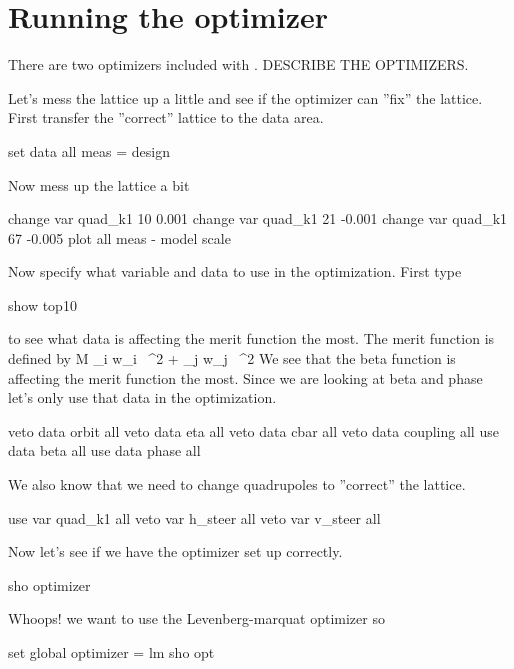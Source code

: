 \documentclass{book}
\begin{document}
\chapter{Running the optimizer}
\label{c:optimizer}

There are two optimizers included with \tao. DESCRIBE THE OPTIMIZERS.

Let's mess the lattice up a little and see if the optimizer can ''fix'' the
lattice. First transfer the ''correct'' lattice to the  data area.
\begin{example}
  set data all meas = design
\end{example}
Now mess up the lattice a bit
\begin{example}
  change var quad\_k1 10 0.001
  change var quad\_k1 21 -0.001
  change var quad\_k1 67 -0.005
  plot all meas - model
  scale
\end{example}

Now specify what variable and data to use in the optimization. First type
\begin{example}
  show top10
\end{example}
to see what data is affecting the merit function the most. The merit function is
defined by
\Begineq
  {\cal M} \equiv \sum_{i} w_i \,
    ^2 + 
  \sum_{j} w_j \,
    ^2
  \label{m1}
\Endeq
We see that the beta function is affecting the merit function the most. Since we
are looking at beta and phase let's only use that data in the optimization.
\begin{example}
  veto data orbit all
  veto data eta all
  veto data cbar all
  veto data coupling all
  use  data beta all
  use  data phase all
\end{example}
We also know that we need to change quadrupoles to ''correct'' the lattice.
\begin{example}
  use var quad\_k1 all
  veto var h\_steer all
  veto var v\_steer all
\end{example}
Now let's see if we have the optimizer set up correctly.
\begin{example}
  sho optimizer
\end{example}
Whoops! we want to use the Levenberg-marquat optimizer so
\begin{example}
  set global optimizer = lm
  sho opt
\end{example}
\end{document}
